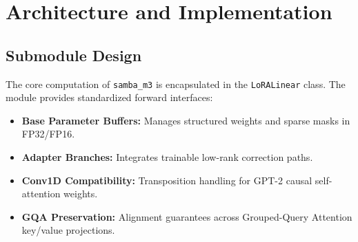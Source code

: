\section{Architecture and Implementation}

\subsection{Submodule Design}
The core computation of \texttt{samba_m3} is encapsulated in the \texttt{LoRALinear} class. The module provides standardized forward interfaces:
\begin{itemize}
\item \textbf{Base Parameter Buffers:} Manages structured weights and sparse masks in FP32/FP16.
\item \textbf{Adapter Branches:} Integrates trainable low-rank correction paths.
\item \textbf{Conv1D Compatibility:} Transposition handling for GPT-2 causal self-attention weights.
\item \textbf{GQA Preservation:} Alignment guarantees across Grouped-Query Attention key/value projections.
\end{itemize}

